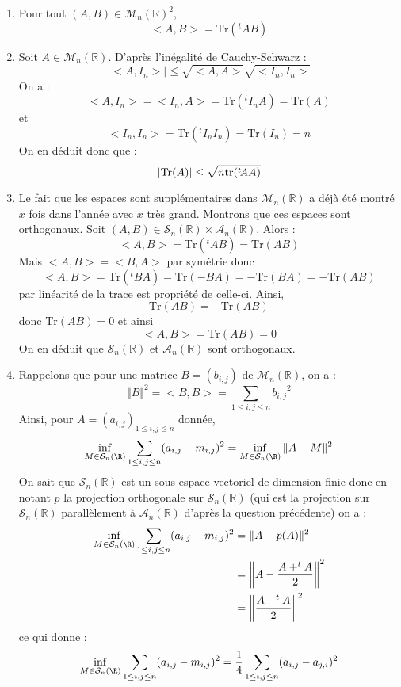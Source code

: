 \documentclass[a4paper,twoside,french,11pt]{VcCours}
\begin{document}
\begin{enumerate}
\item Pour tout $(A,B) \in \mathcal{M}_n(\mathbb{R})^2$,
$$ <A,B> = \textrm{Tr}(^tAB)$$
\item Soit $A \in \mathcal{M}_n(\mathbb{R})$. D'après l'inégalité de Cauchy-Schwarz :
$$ \vert <A,I_n> \vert \leq \sqrt{<A,A>} \sqrt{<I_n,I_n>}$$
On a :
$$ <A,I_n>=<I_n,A> = \textrm{Tr}(^tI_nA) = \textrm{Tr}(A)$$
et 
$$ <I_n,I_n> = \textrm{Tr}(^tI_n I_n) = \textrm{Tr}(I_n) = n$$
On en déduit donc que :
$$ \vert\textrm{Tr}(A) \vert \leq \sqrt{n\hbox{tr}(^t\!AA)}$$
\item Le fait que les espaces sont supplémentaires dans $\mathcal{M}_n(\mathbb{R})$ a déjà été montré $x$ fois dans l'année avec $x$ très grand. Montrons que ces espaces sont orthogonaux. Soit $(A,B) \in \mathcal{S}_n(\mathbb{R}) \times \mathcal{A}_n(\mathbb{R})$. Alors :
$$ <A,B> = \textrm{Tr}(^tAB) = \textrm{Tr}(AB)$$
Mais $<A,B>=<B,A>$ par symétrie donc
$$ <A,B> = \textrm{Tr}(^tBA)  = \textrm{Tr}(-BA) =- \textrm{Tr}(BA) = - \textrm{Tr}(AB)$$
par linéarité de la trace est propriété de celle-ci. Ainsi,
$$  \textrm{Tr}(AB) =  - \textrm{Tr}(AB)$$
donc $\textrm{Tr}(AB)=0$ et ainsi 
$$ <A,B> = \textrm{Tr}(AB) = 0$$
On en déduit que $\mathcal{S}_n(\mathbb{R})$ et $\mathcal{A}_n(\mathbb{R})$ sont orthogonaux.
\item Rappelons que pour une matrice $B=(b_{i,j})$ de $\mathcal{M}_n(\mathbb{R})$, on a :
$$ \Vert B \Vert^2 = <B,B> = \sum_{1 \leq i,j \leq n} {b_{i,j}}^2$$
Ainsi, pour $A=(a_{i,j})_{1 \leq i,j \leq n}$ donnée,
$$ \inf_{M\in{\cal S}_n(\R)}\sum_{1 \leq i,j \leq n}(a_{i,j}-m_{i,j})^2  = \inf_{M\in{\cal S}_n(\R)} \Vert A-M \Vert^2 $$
On sait que $\mathcal{S}_n(\mathbb{R})$ est un sous-espace vectoriel de dimension finie donc en notant $p$ la projection orthogonale sur $\mathcal{S}_n(\mathbb{R})$ (qui est la projection sur $\mathcal{S}_n(\mathbb{R})$ parallèlement à $\mathcal{A}_n(\mathbb{R})$ d'après la question précédente) on a :
\begin{align*}
 \inf_{M\in{\cal S}_n(\R)}\sum_{1 \leq i,j \leq n}(a_{i,j}-m_{i,j})^2 & = \Vert A-p(A) \Vert^2 \\
 & = \left\Vert A- \dfrac{A+^tA}{2} \right\Vert^2 \\
 & =  \left\Vert \dfrac{A-^tA}{2} \right\Vert^2 
 \end{align*}
 ce qui donne :
 $$  \inf_{M\in{\cal S}_n(\R)}\sum_{1 \leq i,j \leq n}(a_{i,j}-m_{i,j})^2 = \dfrac{1}{4} \sum_{1 \leq i,j \leq n} (a_{i,j}-a_{j,i})^2$$
\end{enumerate}
\end{document}
